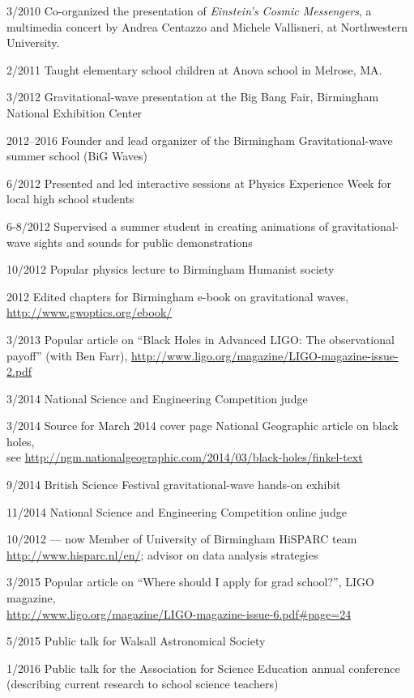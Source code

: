\documentclass[margin,line]{res}
\begin{document}
\begin{resume}
3/2010  	Co-organized the presentation of {\it Einstein's Cosmic Messengers}, a multimedia concert by Andrea Centazzo and Michele Vallisneri, at Northwestern University.

2/2011	Taught elementary school children at Anova school in Melrose, MA.

3/2012	Gravitational-wave presentation at the Big Bang Fair, Birmingham National Exhibition Center

2012--2016	Founder and lead organizer of the Birmingham Gravitational-wave summer school (BiG Waves)

6/2012	Presented and led interactive sessions at Physics Experience Week for local high school students

6-8/2012	Supervised a summer student in creating animations of gravitational-wave sights and sounds for public demonstrations

10/2012	Popular physics lecture to Birmingham Humanist society

2012		Edited chapters for Birmingham e-book on gravitational waves, \url{http://www.gwoptics.org/ebook/}
	  
3/2013	Popular article on ``Black Holes in Advanced LIGO: The observational payoff'' (with Ben Farr), \url{http://www.ligo.org/magazine/LIGO-magazine-issue-2.pdf}

3/2014	National Science and Engineering Competition judge

3/2014	Source for March 2014 cover page National Geographic article on black holes,\\ see \url{http://ngm.nationalgeographic.com/2014/03/black-holes/finkel-text}

9/2014	British Science Festival gravitational-wave hands-on exhibit

11/2014	National Science and Engineering Competition online judge

10/2012 --- now 	Member of University of Birmingham HiSPARC team \url{http://www.hisparc.nl/en/}; advisor on data analysis strategies

3/2015	Popular article on ``Where should I apply for grad school?'', LIGO magazine,\\ \url{http://www.ligo.org/magazine/LIGO-magazine-issue-6.pdf\#page=24}

5/2015 	Public talk for Walsall Astronomical Society

1/2016	Public talk for the Association for Science Education annual conference (describing current research to school science teachers)


\end{resume}
\end{document}
